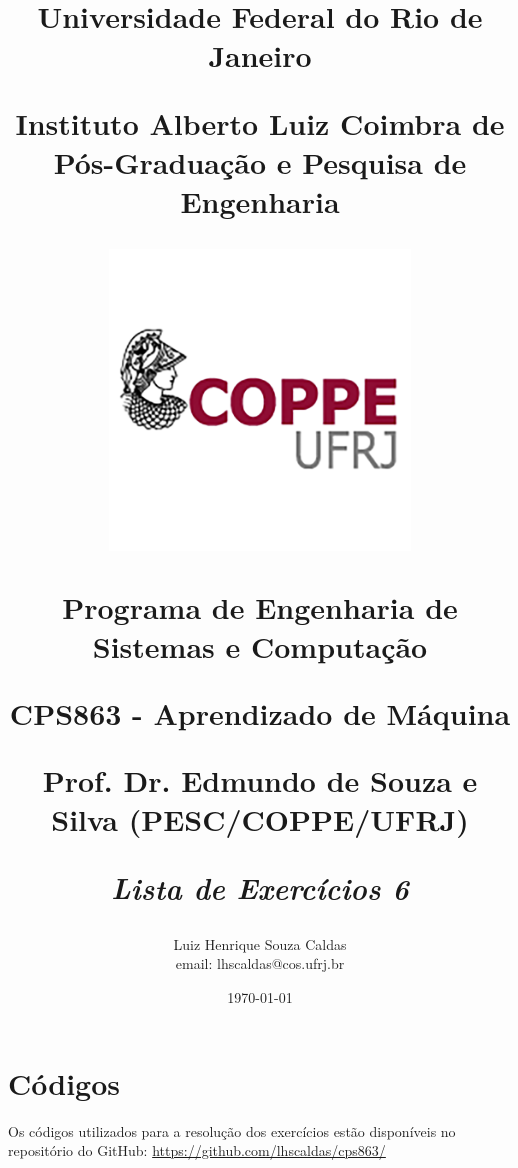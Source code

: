 \documentclass[12 pt]{article}
\title{%
\textbf{\huge Universidade Federal do Rio de Janeiro} \par
\textbf{\LARGE Instituto Alberto Luiz Coimbra de Pós-Graduação e Pesquisa de Engenharia} \par

\includegraphics[width=8cm]{COPPE UFRJ.png} \par

\textbf{Programa de Engenharia de Sistemas e Computação} \par

CPS863 - Aprendizado de Máquina  \par

Prof. Dr. Edmundo de Souza e Silva (PESC/COPPE/UFRJ)\par

\vspace{1\baselineskip}
\textbf{\textit{Lista de Exercícios 6}} \par
}
\author{Luiz Henrique Souza Caldas\\email: lhscaldas@cos.ufrj.br}
\date{\today}
\begin{document}
\maketitle





\section*{Códigos}

Os códigos utilizados para a resolução dos exercícios estão disponíveis no repositório do GitHub: \url{https://github.com/lhscaldas/cps863/}

\nocite{sutton2018reinforcement}
\end{document}

